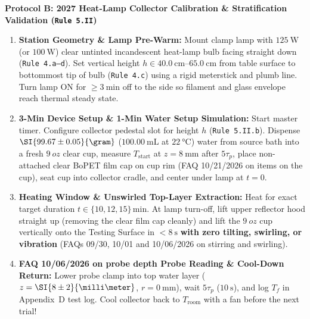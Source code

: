 \begin{devicebox}
\begin{twocol}[0.485]
\begin{enumerate}
\end{enumerate}
\nextcol[0.485]
\textbf{Protocol B: 2027 Heat-Lamp Collector Calibration \& Stratification Validation (\texttt{Rule 5.II})}
\begin{enumerate}
  \item \textbf{Station Geometry \& Lamp Pre-Warm:} Mount clamp lamp with $\SI{125}{\watt}$ (or $\SI{100}{\watt}$) clear untinted incandescent heat-lamp bulb facing straight down (\texttt{Rule 4.a--d}). Set vertical height $h \in \SIrange{40.0}{65.0}{\centi\meter}$ from table surface to bottommost tip of bulb (\texttt{Rule 4.c}) using a rigid meterstick and plumb line. Turn lamp ON for $\ge\SI{3}{\minute}$ off to the side so filament and glass envelope reach thermal steady state.
  \item \textbf{3-Min Device Setup \& 1-Min Water Setup Simulation:} Start master timer. Configure collector pedestal slot for height $h$ (\texttt{Rule 5.II.b}). Dispense $\SI{99.67 \pm 0.05}{\gram}$ ($\SI{100.00}{\milli\liter}$ at $\SI{22}{\celsius}$) water from source bath into a fresh $\SI{9}{oz}$ clear cup, measure $T_{\mathrm{start}}$ at $z = \SI{8}{\milli\meter}$ after $5\tau_p$, place non-attached clear BoPET film cap on cup rim (FAQ 10/21/2026 on items on the cup), seat cup into collector cradle, and center under lamp at $t = 0$.
  \item \textbf{Heating Window \& Unswirled Top-Layer Extraction:} Heat for exact target duration $t \in \{10, 12, 15\}\,\si{\minute}$. At lamp turn-off, lift upper reflector hood straight up (removing the clear film cap cleanly) and lift the $\SI{9}{oz}$ cup vertically onto the Testing Surface in $<\SI{8}{\second}$ \textbf{with zero tilting, swirling, or vibration} (FAQs 09/30, 10/01 and 10/06/2026 on stirring and swirling).
  \item \textbf{FAQ 10/06/2026 on probe depth Probe Reading \& Cool-Down Return:} Lower probe clamp into top water layer ($z = \SI{8 \pm 2}{\milli\meter}$, $r = \SI{0}{\milli\meter}$), wait $5\tau_p$ ($\SI{10}{\second}$), and log $T_f$ in Appendix~D test log. Cool collector back to $T_{\mathrm{room}}$ with a fan before the next trial!
\end{enumerate}
\end{twocol}
\end{devicebox}

